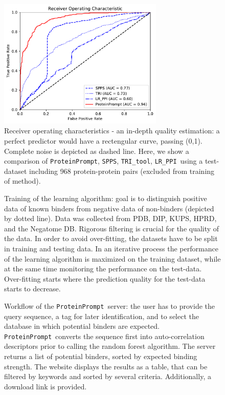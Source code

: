 \documentclass{article}
\newcommand{\spps}{\texttt{SPPS}}
\newcommand{\tri}{\texttt{TRI\_tool}}
\newcommand{\lr}{\texttt{LR\_PPI}}
\newcommand{\tool}{\texttt{ProteinPrompt}}
\begin{document}
\begin{figure}
  \centerline{\includegraphics[width=0.7\textwidth]{img/comparison_roc.pdf}}
  \caption{Receiver operating characteristics - an in-depth quality estimation: a perfect predictor would have a rectengular curve, passing (0,1). Complete noise is depicted as dashed line. Here, we show a comparison of \tool, \spps, \tri, \lr\ using a test-dataset including 968 protein-protein pairs (excluded from training of method). }
  \label{fig:comparison}
\end{figure}


\begin{figure}
  
  \caption{ Training of the learning algorithm: goal is to distinguish positive data of known binders from negative data of non-binders (depicted by dotted line). Data was collected from PDB, DIP, KUPS, HPRD, and the Negatome DB. Rigorous filtering is crucial for the quality of the data. In order to avoid over-fitting, the datasets have to be split in training and testing data. In an iterative process the performance of the learning algorithm is maximized on the training dataset, while at the same time monitoring the performance on the test-data. Over-fitting starts where the prediction quality for the test-data starts to decrease.}
  \label{fig:training}
\end{figure}


\begin{figure}
  
  \caption{ Workflow of the \tool\  server: the user has to provide the query sequence, a tag for later identification, and to select the database in which potential binders are expected. \tool\  converts the sequence first into auto-correlation descriptors prior to calling the random forest algorithm.
    The server returns a list of potential binders, sorted by expected binding strength.
     The website displays the results as a table, that can be filtered by keywords and sorted by several criteria. 
    Additionally, a download link is provided. }
  \label{fig:workflow}
\end{figure}
\end{document}
